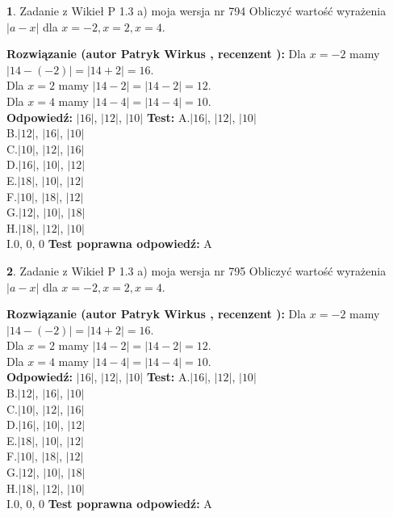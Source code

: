 \documentclass[12pt, a4paper]{article}
\theoremstyle{definition} %
\newtheorem{zad}{}
\newcommand{\zadStart}[1]{\begin{zad}#1\newline}
\newcommand{\zadStop}{\end{zad}}
\newcommand{\rozwStart}[2]{\noindent \textbf{Rozwiązanie (autor #1 , recenzent #2): }\newline}
\newcommand{\rozwStop}{\newline}
\newcommand{\odpStart}{\noindent \textbf{Odpowiedź:}\newline}
\newcommand{\odpStop}{\newline}
\newcommand{\testStart}{\noindent \textbf{Test:}\newline}
\newcommand{\testStop}{\newline}
\newcommand{\kluczStart}{\noindent \textbf{Test poprawna odpowiedź:}\newline}
\newcommand{\kluczStop}{\newline}
\begin{document}
\zadStart{Zadanie z Wikieł P 1.3 a) moja wersja nr 794}
Obliczyć wartość wyrażenia $|a - x|$ dla $x=-2,x=2,x=4$.
\zadStop
\rozwStart{Patryk Wirkus}{}
Dla $x = -2$ mamy $|14 - (-2)| = |14 + 2| = 16$.\\
Dla $x = 2$ mamy $|14 - 2| = |14 - 2| = 12$.\\
Dla $x = 4$ mamy $|14 - 4| = |14 - 4| = 10$.\\
\rozwStop
\odpStart
$|16|$, $|12|$, $|10|$
\odpStop
\testStart
A.$|16|$, $|12|$, $|10|$\\
B.$|12|$, $|16|$, $|10|$\\
C.$|10|$, $|12|$, $|16|$\\
D.$|16|$, $|10|$, $|12|$\\
E.$|18|$, $|10|$, $|12|$\\
F.$|10|$, $|18|$, $|12|$\\
G.$|12|$, $|10|$, $|18|$\\
H.$|18|$, $|12|$, $|10|$\\
I.$0$, $0$, $0$
\testStop
\kluczStart
A
\kluczStop



\zadStart{Zadanie z Wikieł P 1.3 a) moja wersja nr 795}
Obliczyć wartość wyrażenia $|a - x|$ dla $x=-2,x=2,x=4$.
\zadStop
\rozwStart{Patryk Wirkus}{}
Dla $x = -2$ mamy $|14 - (-2)| = |14 + 2| = 16$.\\
Dla $x = 2$ mamy $|14 - 2| = |14 - 2| = 12$.\\
Dla $x = 4$ mamy $|14 - 4| = |14 - 4| = 10$.\\
\rozwStop
\odpStart
$|16|$, $|12|$, $|10|$
\odpStop
\testStart
A.$|16|$, $|12|$, $|10|$\\
B.$|12|$, $|16|$, $|10|$\\
C.$|10|$, $|12|$, $|16|$\\
D.$|16|$, $|10|$, $|12|$\\
E.$|18|$, $|10|$, $|12|$\\
F.$|10|$, $|18|$, $|12|$\\
G.$|12|$, $|10|$, $|18|$\\
H.$|18|$, $|12|$, $|10|$\\
I.$0$, $0$, $0$
\testStop
\kluczStart
A
\kluczStop
\end{document}
